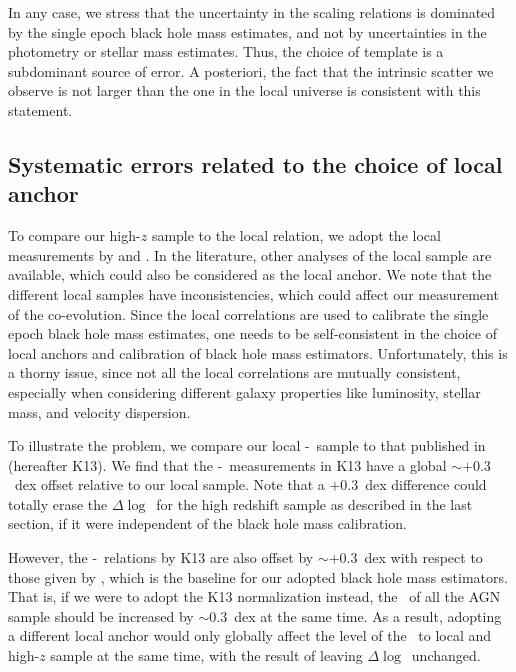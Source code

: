 \documentclass[apj]{emulateapj}
\begin{document}

In any case, we stress that the uncertainty in the scaling relations is dominated by the single epoch black hole mass estimates, and not by uncertainties in the photometry or stellar mass estimates. Thus, the choice of template is a subdominant source of error. A posteriori, the fact that the intrinsic scatter we observe is not larger than the one in the local universe is consistent with this statement.

\subsection{Systematic errors related to the choice of local anchor}
\label{sec:local_sys}

To compare our high-$z$ sample to the local relation, we adopt the local measurements by \citet{Ben++10, Bennert++2011} and  \citet{H+R04}. In the literature, other analyses of the local sample are available, which could also be considered as the local anchor. We note that the different local samples have inconsistencies, which could affect our measurement of the co-evolution. Since the local correlations are used to calibrate the single epoch black hole mass estimates, one needs to be self-consistent in the choice of local anchors and calibration of black hole mass estimators. Unfortunately, this is a thorny issue, since not all the local correlations are mutually consistent, especially when considering different galaxy properties like luminosity, stellar mass, and velocity dispersion.

To illustrate the problem, we compare our local \mbh-\smass\ sample to that published in \citet{Kormendy13} (hereafter K13). We find that the \mbh-\smass\ measurements in K13 have a global $\sim+0.3$~dex offset relative to our local sample. Note that a $+0.3$~dex difference could totally erase the $\Delta\log$\mbh\ for the high redshift sample as described in the last section, if it were independent of the black hole mass calibration.

However, the \mbh-\sigstar\ relations by K13 are also offset by  $\sim+0.3$~dex with respect to those given by \citet{Woo2010}, which is the baseline for our adopted black hole mass estimators. That is, if we were to adopt the K13 normalization instead, the \mbh\ of all the AGN sample should be increased by $\sim$0.3~dex at the same time. As a result, adopting a different local anchor would only globally affect the level of the \mbh\ to local and high-$z$ sample at the same time, with the result of leaving $\Delta\log$\mbh\ unchanged.  
\end{document}
